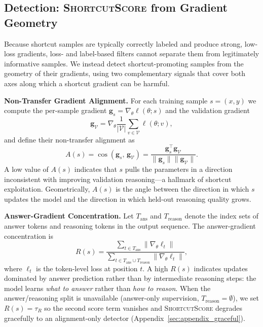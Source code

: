 \subsection{Detection: \textsc{ShortcutScore} from Gradient Geometry}
\label{sec:method_detection}

Because shortcut samples are typically correctly labeled and produce strong, low-loss gradients, loss- and label-based filters cannot separate them from legitimately informative samples. We instead detect shortcut-promoting samples from the geometry of their gradients, using two complementary signals that cover both axes along which a shortcut gradient can be harmful.

\textbf{Non-Transfer Gradient Alignment.} For each training sample $s = (x, y)$ we compute the per-sample gradient $\mathbf{g}_s = \nabla_\theta \ell(\theta; s)$ and the validation gradient
\begin{equation}
    \mathbf{g}_{\mathcal{V}} = \nabla_\theta \frac{1}{|\mathcal{V}|} \sum_{v \in \mathcal{V}} \ell(\theta; v),
\end{equation}
and define their non-transfer alignment as
\begin{equation}
    A(s) = \cos(\mathbf{g}_s,\, \mathbf{g}_{\mathcal{V}}) = \frac{\mathbf{g}_s^\top \mathbf{g}_{\mathcal{V}}}{\|\mathbf{g}_s\|\|\mathbf{g}_{\mathcal{V}}\|}.
\end{equation}
A low value of $A(s)$ indicates that $s$ pulls the parameters in a direction inconsistent with improving validation reasoning---a hallmark of shortcut exploitation. Geometrically, $A(s)$ is the angle between the direction in which $s$ updates the model and the direction in which held-out reasoning quality grows.

\textbf{Answer-Gradient Concentration.} Let $T_{\mathrm{ans}}$ and $T_{\mathrm{reason}}$ denote the index sets of answer tokens and reasoning tokens in the output sequence. The answer-gradient concentration is
\begin{equation}
    R(s) = \frac{\sum_{t \in T_{\mathrm{ans}}} \|\nabla_\theta \ell_t\|}{\sum_{t \in T_{\mathrm{ans}} \cup T_{\mathrm{reason}}} \|\nabla_\theta \ell_t\|},
\end{equation}
where $\ell_t$ is the token-level loss at position $t$. A high $R(s)$ indicates updates dominated by answer prediction rather than by intermediate reasoning steps: the model learns \emph{what to answer} rather than \emph{how to reason}. When the answer/reasoning split is unavailable (answer-only supervision, $T_{\mathrm{reason}}=\emptyset$), we set $R(s)=\tau_R$ so the second score term vanishes and \textsc{ShortcutScore} degrades gracefully to an alignment-only detector (Appendix~\ref{sec:appendix_graceful}).

